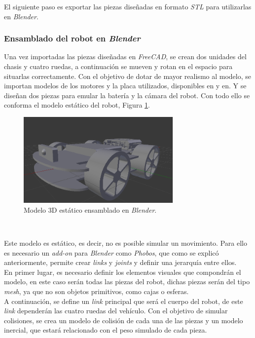 El siguiente paso es exportar las piezas diseñadas en formato \textit{STL} para utilizarlas en \textit{Blender}.\\

\subsubsection{Ensamblado del robot en \textit{Blender}}

Una vez importadas las piezas diseñadas en \textit{FreeCAD}, se crean dos unidades del chasis y cuatro ruedas, a continuación se mueven y rotan en el espacio para situarlas
correctamente. Con el objetivo de dotar de mayor realismo al modelo, se importan modelos de los motores y la placa utilizados, disponibles en y en. Y se diseñan dos piezas para
emular la batería y la cámara del robot. Con todo ello se conforma el modelo estático del robot, Figura \ref{fig:blendermodel}.\\

\begin{figure} [h!]
	\begin{center}
		\includegraphics[width=8cm]{figs/blenderModel}
	\end{center}
	\caption{Modelo 3D estático ensamblado en \textit{Blender}.}
	\label{fig:blendermodel}
\end{figure}\

Este modelo es estático, es decir, no es posible simular un movimiento. Para ello es necesario un \textit{add-on} para \textit{Blender} como \textit{Phobos}, que como se explicó
anteriormente, permite crear \textit{links} y \textit{joints} y definir una jerarquía entre ellos.\\

En primer lugar, es necesario definir los elementos visuales que compondrán el modelo, en este caso serán todas las piezas del robot, dichas piezas serán del tipo \textit{mesh},
ya que no son objetos primitivos, como cajas o esferas.\\

A continuación, se define un \textit{link} principal que será el cuerpo del robot, de este \textit{link} dependerán las cuatro ruedas del vehículo. Con el objetivo de simular
colisiones, se crea un modelo de colisión de cada una de
las piezas y un modelo inercial, que estará relacionado con el peso simulado de cada pieza.\\

